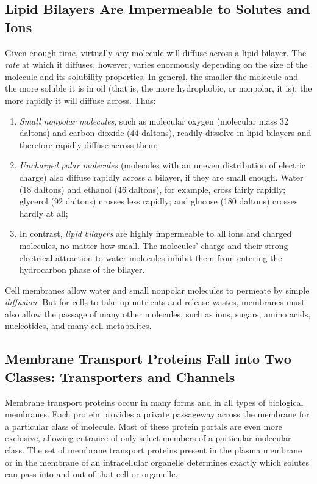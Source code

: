 \subsection{Lipid Bilayers Are Impermeable to Solutes and Ions}

Given enough time, virtually any molecule will diffuse across a lipid bilayer.
The \textit{rate} at which it diffuses, however, varies
enormously depending on the size of the molecule and its solubility properties.
In general, the smaller the molecule and the more soluble it is in
oil (that is, the more hydrophobic, or nonpolar, it is), the more rapidly it
will diffuse across. Thus:

\begin{enumerate}
\item \textit{Small nonpolar molecules}, such as molecular oxygen (molecular
mass 32 daltons) and carbon dioxide (44 daltons), readily dissolve
in lipid bilayers and therefore rapidly diffuse across them;
\item \textit{Uncharged polar molecules} (molecules with an uneven distribution
of electric charge) also diffuse rapidly across a bilayer, if they
are small enough. Water (18 daltons) and ethanol (46 daltons), for
example, cross fairly rapidly; glycerol (92 daltons) crosses less rapidly;
and glucose (180 daltons) crosses hardly at all;
\item In contrast, \textit{lipid bilayers} are highly impermeable to all ions and
charged molecules, no matter how small. The molecules’ charge
and their strong electrical attraction to water molecules inhibit
them from entering the hydrocarbon phase of the bilayer.
\end{enumerate}

Cell membranes allow water and small nonpolar molecules to permeate
by simple \textit{diffusion}. But for cells to take up nutrients and release wastes,
membranes must also allow the passage of many other molecules, such
as ions, sugars, amino acids, nucleotides, and many cell metabolites.

\subsection{Membrane Transport Proteins Fall into Two Classes: Transporters and Channels}

Membrane transport proteins occur in many forms and in all types of biological
membranes. Each protein provides a private passageway across
the membrane for a particular class of molecule. Most of these protein portals are even more exclusive,
allowing entrance of only select members of a particular molecular class.
The set of membrane transport proteins present in the plasma
membrane or in the membrane of an intracellular organelle determines
exactly which solutes can pass into and out of that cell or organelle.


